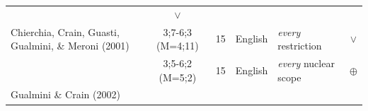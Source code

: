 \documentclass[oneside]{report}
\theoremstyle{definition}
\theoremstyle{definition}
\theoremstyle{definition}
\theoremstyle{remark}
\begin{document}
\begin{longtable}[]{@{}lccclc@{}}
\begin{minipage}[t]{0.25\columnwidth}
\end{minipage} & \begin{minipage}[t]{0.13\columnwidth}\centering\strut
\(\lor\)\strut
\end{minipage}\tabularnewline
\begin{minipage}[t]{0.23\columnwidth}\raggedright\strut
Chierchia, Crain, Guasti, Gualmini, \& Meroni (2001)\strut
\end{minipage} & \begin{minipage}[t]{0.07\columnwidth}\centering\strut
3;7-6;3 (M=4;11)\strut
\end{minipage} & \begin{minipage}[t]{0.05\columnwidth}\centering\strut
15\strut
\end{minipage} & \begin{minipage}[t]{0.10\columnwidth}\centering\strut
English\strut
\end{minipage} & \begin{minipage}[t]{0.25\columnwidth}\raggedright\strut
\emph{every} restriction\strut
\end{minipage} & \begin{minipage}[t]{0.13\columnwidth}\centering\strut
\(\lor\)\strut
\end{minipage}\tabularnewline
\begin{minipage}[t]{0.23\columnwidth}\raggedright\strut
\strut
\end{minipage} & \begin{minipage}[t]{0.07\columnwidth}\centering\strut
3;5-6;2 (M=5;2)\strut
\end{minipage} & \begin{minipage}[t]{0.05\columnwidth}\centering\strut
15\strut
\end{minipage} & \begin{minipage}[t]{0.10\columnwidth}\centering\strut
English\strut
\end{minipage} & \begin{minipage}[t]{0.25\columnwidth}\raggedright\strut
\emph{every} nuclear scope\strut
\end{minipage} & \begin{minipage}[t]{0.13\columnwidth}\centering\strut
\(\oplus\)\strut
\end{minipage}\tabularnewline
\begin{minipage}[t]{0.23\columnwidth}\raggedright\strut
Gualmini \& Crain (2002)\strut
\end{minipage} & \begin{minipage}[t]{0.07\columnwidth}\centering\strut

\end{minipage}
\end{longtable}
\end{document}
